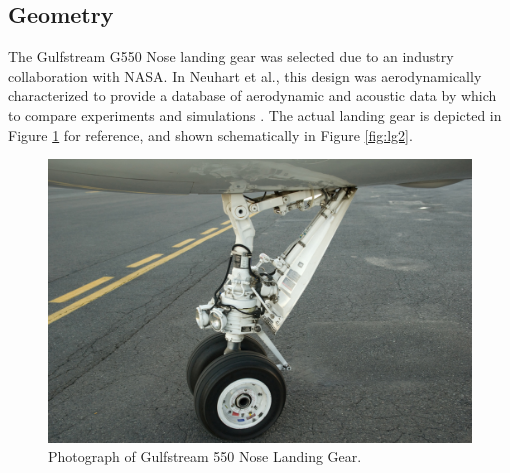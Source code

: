 \subsection{Geometry}

The Gulfstream G550 Nose landing gear was selected due to an industry collaboration with NASA. In Neuhart et al., this design was aerodynamically characterized to provide a database of aerodynamic and acoustic data by which to compare experiments and simulations \cite{neuhart2009}.
The actual landing gear is depicted in Figure \ref{fig:lg1} for reference, and shown schematically in Figure \ref{fig:lg2}.



\begin{figure}
	\begin{center}
		\centerline{\includegraphics[scale=0.4]{figures/g550_nlg.pdf}}
		\caption{Photograph of Gulfstream 550 Nose Landing Gear.}
		\label{fig:lg1}
	\end{center}
\end{figure}

